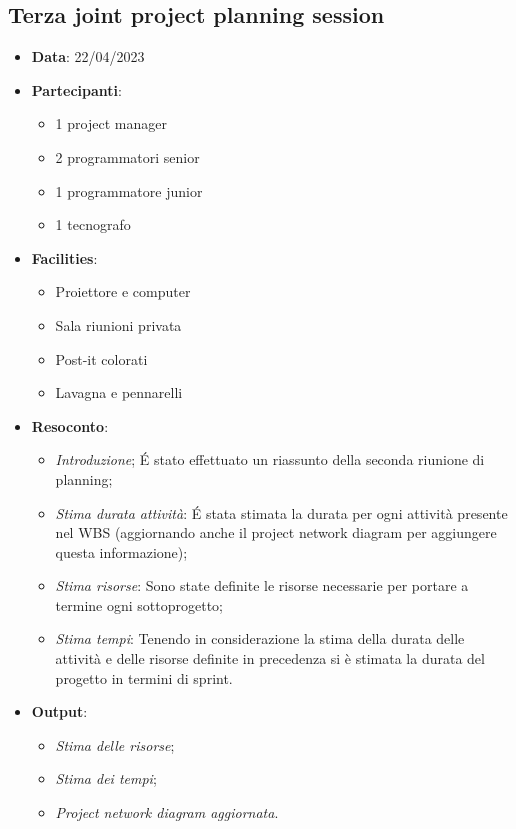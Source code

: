 \documentclass{article}
\begin{document}
  \subsection{Terza joint project planning session}
  \begin{itemize}
    \item \textbf{Data}: 22/04/2023
    \item \textbf{Partecipanti}:
    \begin{itemize}
      \item 1 project manager
      \item 2 programmatori senior
      \item 1 programmatore junior
      \item 1 tecnografo
    \end{itemize}
    \item \textbf{Facilities}:
    \begin{itemize}
      \item Proiettore e computer
      \item Sala riunioni privata
      \item Post-it colorati
      \item Lavagna e pennarelli
    \end{itemize}
    \item \textbf{Resoconto}:
    \begin{itemize}
      \item \emph{Introduzione};
        É stato effettuato un riassunto della seconda riunione di planning;
      \item \emph{Stima durata attività}: 
        É stata stimata la durata per ogni attività presente nel WBS (aggiornando anche il 
        project network diagram per aggiungere questa informazione);
      \item \emph{Stima risorse}: 
        Sono state definite le risorse necessarie per portare a termine ogni sottoprogetto;
      \item \emph{Stima tempi}:
        Tenendo in considerazione la stima della durata delle attività e delle risorse definite
        in precedenza si è stimata la durata del progetto in termini di sprint.
    \end{itemize}
    \item \textbf{Output}: 
    \begin{itemize}
      \item \emph{Stima delle risorse};
      \item \emph{Stima dei tempi};
      \item \emph{Project network diagram aggiornata}.
    \end{itemize}
  \end{itemize}
\end{document}
